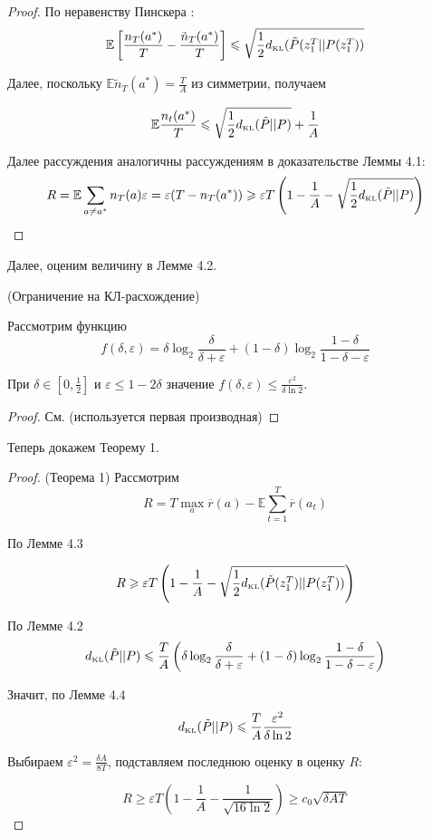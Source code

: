 \documentclass[a4paper]{article}
\newcommand{\E}{\mathbb{E}}
\newcommand{\dkl}{d_{\mbox{\tiny KL}}}
\newcommand{\ltwo}{\log_2 }
\def\eps{\varepsilon}
\begin{document}
\begin{proof}
По неравенству Пинскера \cite{bubeck}:
$$
\E\left[\frac{n_T(a^*)}{T}-\frac{\tilde{n}_T(a^*)}{T}\right]\leqslant\sqrt{\frac{1}{2}\dkl(\tilde{P}(z_1^T||P(z_1^T))}
$$

Далее, поскольку $\E \tilde{n}_T(a^*)=\frac{T}{A}$ из симметрии, получаем

$$\E\frac{n_t(a^*)}{T}\leqslant\sqrt{\frac{1}{2}\dkl(\tilde{P}||P)}+\frac{1}{A}$$

Далее рассуждения аналогичны рассуждениям в доказательстве Леммы 4.1:
$$R=\E\sum\limits_{a\neq a^*}n_T(a)\eps=\eps(T-n_T(a^*))\geqslant \eps T\left(1-\frac{1}{A}-\sqrt{\frac{1}{2}\dkl(\tilde{P}||P)}\right)$$
\end{proof}

Далее, оценим величину в Лемме 4.2.

\begin{lemma}{(Ограничение на КЛ-расхождение)}

Рассмотрим функцию $$f(\delta,\eps)=\delta\ltwo\frac{\delta}{\delta+\eps}+(1-\delta)\ltwo\frac{1-\delta}{1-\delta-\eps}$$

При $\delta\in[0,\frac{1}{2}]$ и $\eps\leqslant 1-2\delta$ значение $f(\delta,\eps)\leqslant\frac{\eps^2}{\delta\ln 2}$.
\end{lemma}

\begin{proof}
См. \cite{jaksch} (используется первая производная)
\end{proof}

Теперь докажем Теорему 1.

\begin{proof}{(Теорема 1)}
Рассмотрим
$$R=T\max\limits_a \overline{r}(a)-\E\sum\limits_{t=1}^T\overline{r}(a_t)$$

По Лемме 4.3

$$
R\geqslant\eps T \left(1-\frac{1}{A}-\sqrt{\frac{1}{2}\dkl(\tilde{P}(z_1^T)||P(z_1^T))}\right)
$$

По Лемме 4.2
$$
\dkl(\tilde{P}||P)\leqslant\frac{T}{A}\left(\delta\ltwo\frac{\delta}{\delta+\eps}+(1-\delta)\ltwo\frac{1-\delta}{1-\delta-\eps}\right)
$$

Значит, по Лемме 4.4
$$
\dkl(\tilde{P}||P)\leqslant \frac{T}{A}\frac{\eps^2}{\delta\ln 2}
$$

Выбираем $\eps^2=\frac{\delta A}{8T}$, подставляем последнюю оценку в оценку $R$:

$$
R\geqslant \eps T(1-\frac{1}{A}-\frac{1}{\sqrt{16\ln 2}})\geqslant c_0\sqrt{\delta AT}
$$
\end{proof}
\end{document}
